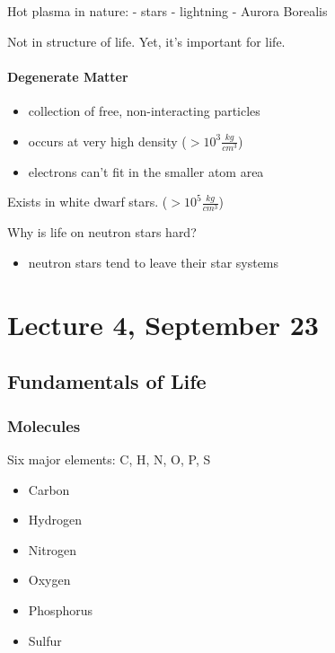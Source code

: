 Hot plasma in nature: - stars - lightning - Aurora Borealis

Not in structure of life. Yet, it's important for life.

\hypertarget{degenerate-matter}{%
\paragraph{Degenerate Matter}\label{degenerate-matter}}

\begin{itemize}
\tightlist
\item
  collection of free, non-interacting particles
\item
  occurs at very high density (\(>10^3 \frac{kg}{cm^3}\))
\item
  electrons can't fit in the smaller atom area
\end{itemize}

Exists in white dwarf stars. (\(>10^5 \frac{kg}{cm^3}\))

Why is life on neutron stars hard?

\begin{itemize}
\tightlist
\item
  neutron stars tend to leave their star systems
\end{itemize}

\hypertarget{lecture-4-september-23}{%
\section{Lecture 4, September 23}\label{lecture-4-september-23}}

\hypertarget{fundamentals-of-life}{%
\subsection{Fundamentals of Life}\label{fundamentals-of-life}}

\hypertarget{molecules}{%
\subsubsection{Molecules}\label{molecules}}

Six major elements: C, H, N, O, P, S

\begin{itemize}
\tightlist
\item
  Carbon
\item
  Hydrogen
\item
  Nitrogen
\item
  Oxygen
\item
  Phosphorus
\item
  Sulfur
\end{itemize}

